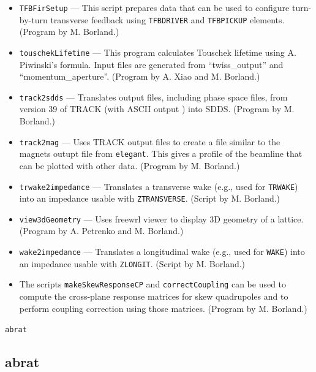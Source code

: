 \documentclass[11pt]{article}
\begin{document}
\begin{itemize}
  model. Computes fringe integrals and other parameters needed by the \verb|LGBEND| segmented dipole model.
\item {\tt TFBFirSetup} --- This script prepares data that can be used to configure turn-by-turn transverse feedback using
  \verb|TFBDRIVER| and \verb|TFBPICKUP| elements.
  (Program by M. Borland.)
\item {\tt touschekLifetime} --- This program calculates Touschek lifetime using A. Piwinski's formula.
        Input files are generated from ``twiss\_output'' and ``momentum\_aperture''.  (Program by A. Xiao and M. Borland.)
\item {\tt track2sdds} --- Translates output files, including phase space files, from version 39 of TRACK (with ASCII output \cite{TRACK})
  into SDDS. 
  (Program by M. Borland.)
\item {\tt track2mag} --- Uses TRACK output files to create a file similar to the magnets outupt file from {\tt elegant}.
  This gives a profile of the beamline that can be plotted with other data.
  (Program by M. Borland.)
\item {\tt trwake2impedance} --- Translates a transverse wake (e.g., used for \verb|TRWAKE|) into an impedance usable with
  \verb|ZTRANSVERSE|. (Script by M. Borland.)
\item {\tt view3dGeometry} --- Uses freewrl viewer to display 3D geometry of a lattice. 
  (Program by A. Petrenko and M. Borland.)
\item {\tt wake2impedance} --- Translates a longitudinal wake (e.g., used for \verb|WAKE|) into an impedance usable with
  \verb|ZLONGIT|. (Script by M. Borland.)
\item The scripts \verb|makeSkewResponseCP| and \verb|correctCoupling| can be used to compute the cross-plane response
  matrices for skew quadrupoles and to perform coupling correction using those matrices.
  (Program by M. Borland.)
\end{itemize}

\newpage
\begin{center}{\Large\verb|abrat|}\end{center}
\subsection{abrat}
\end{document}
